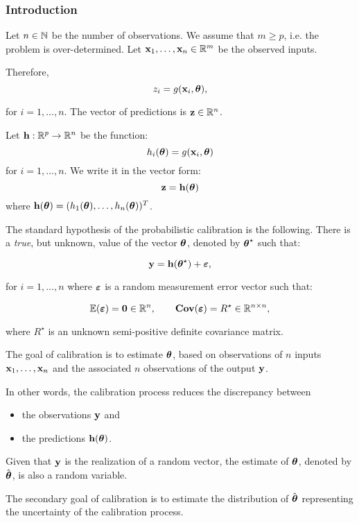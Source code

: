 \documentclass[aspectratio=169]{beamer}
\begin{document}
\begin{frame}
\frametitle{Introduction}
Let $n \in \mathbb{N}$ be the number of observations. 
We assume that $m \geq p$, i.e. the problem is over-determined. 
Let ${\bf x}_1, \ldots, {\bf x}_n \in \mathbb{R}^{m}$ be the observed inputs. 

Therefore, 
$$
z_i = g({\bf x}_i, \boldsymbol{\theta}),
$$

for $i=1,...,n$. 
The vector of predictions is ${\bf z} \in \mathbb{R}^{n}$. 

Let ${\bf h} : \mathbb{R}^p \rightarrow \mathbb{R}^{n}$ be the function:
$$
h_i(\boldsymbol{\theta}) = g({\bf x}_i, \boldsymbol{\theta})
$$
for $i=1, \ldots, n$. 
We write it in the vector form:
$$
{\bf z} = {\bf h}(\boldsymbol{\theta})
$$
where ${\bf h}(\boldsymbol{\theta}) = (h_1(\boldsymbol{\theta}), \ldots, h_n(\boldsymbol{\theta}))^T$.

\end{frame}


\begin{frame}
The standard hypothesis of the probabilistic calibration is the following. 
There is a \emph{true}, but unknown, value of the vector $\boldsymbol{\theta}$, 
denoted by $\boldsymbol{\theta}^\star$ such that:

$$
{\bf y} = {\bf h}(\boldsymbol{\theta}^\star) + \boldsymbol{\varepsilon},
$$

for $i=1,...,n$ where $\boldsymbol{\varepsilon}$ is a random
measurement error vector such that:

$$
\mathbb{E}(\boldsymbol{\varepsilon}) = \boldsymbol{0} \in \mathbb{R}^{n}, \qquad 
\mathbf{Cov}(\boldsymbol{\varepsilon}) = R^\star \in \mathbb{R}^{n\times n},
$$

where $R^\star$ is an unknown semi-positive definite covariance matrix.

\end{frame}


\begin{frame}
The goal of calibration is to estimate $\boldsymbol{\theta}$, based on
observations of $n$ inputs
${\bf x}_1, \ldots, {\bf x}_n$ and the associated $n$
observations of the output ${\bf y}$. 

In other words, the calibration process reduces the discrepancy between 
\begin{itemize}
\item  the observations ${\bf y}$ and 
\item  the predictions ${\bf h}(\boldsymbol{\theta})$. 
\end{itemize}

\vspace{20pt}

Given that ${\bf y}$ is the realization of a random
vector, the estimate of $\boldsymbol{\theta}$, denoted by
$\hat{\boldsymbol{\theta}}$, is also a random variable. 

The secondary goal of calibration is to estimate the distribution of
$\hat{\boldsymbol{\theta}}$ representing the uncertainty of the
calibration process.

\end{frame}
\end{document}
